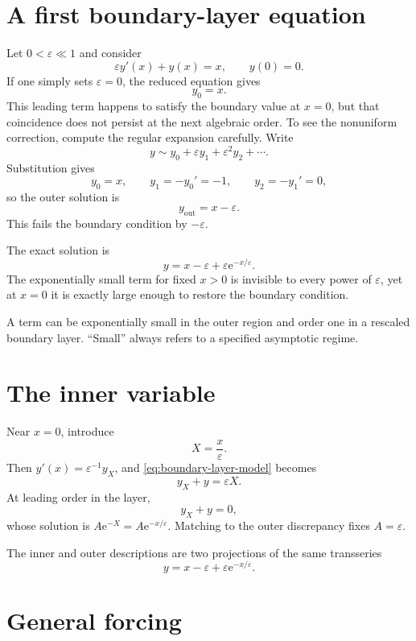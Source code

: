 \documentclass[11pt,openany]{book}
\theoremstyle{definition}
\theoremstyle{plain}
\theoremstyle{remark}
\newcommand{\eps}{\varepsilon}
\newcommand{\e}{\mathrm{e}}
\newcommand{\asym}{\sim}
\begin{document}
\section{A first boundary-layer equation}

Let $0<\eps\ll1$ and consider
\begin{equation}\label{eq:boundary-layer-model}
 \eps y'(x)+y(x)=x,
 \qquad y(0)=0.
\end{equation}
If one simply sets $\eps=0$, the reduced equation gives
\[
 y_0=x.
\]
This leading term happens to satisfy the boundary value at $x=0$, but that coincidence does not persist at the next algebraic order. To see the nonuniform correction, compute the regular expansion carefully. Write
\[
 y\asym y_0+\eps y_1+\eps^2y_2+\cdots.
\]
Substitution gives
\[
 y_0=x,
 \qquad y_1=-y_0'=-1,
 \qquad y_2=-y_1'=0,
\]
so the outer solution is
\[
 y_{\mathrm{out}}=x-\eps.
\]
This fails the boundary condition by $-\eps$.

The exact solution is
\begin{equation}\label{eq:boundary-layer-exact}
 y=x-\eps+\eps\e^{-x/\eps}.
\end{equation}
The exponentially small term for fixed $x>0$ is invisible to every power of $\eps$, yet at $x=0$ it is exactly large enough to restore the boundary condition.

\begin{warningbox}
A term can be exponentially small in the outer region and order one in a rescaled boundary layer. ``Small'' always refers to a specified asymptotic regime.
\end{warningbox}

\section{The inner variable}

Near $x=0$, introduce
\[
 X=\frac{x}{\eps}.
\]
Then $y'(x)=\eps^{-1}y_X$, and \cref{eq:boundary-layer-model} becomes
\[
 y_X+y=\eps X.
\]
At leading order in the layer,
\[
 y_X+y=0,
\]
whose solution is $A\e^{-X}=A\e^{-x/\eps}$. Matching to the outer discrepancy fixes $A=\eps$.

The inner and outer descriptions are two projections of the same transseries
\[
 y=x-\eps+\eps\e^{-x/\eps}.
\]

\section{General forcing}
\end{document}
